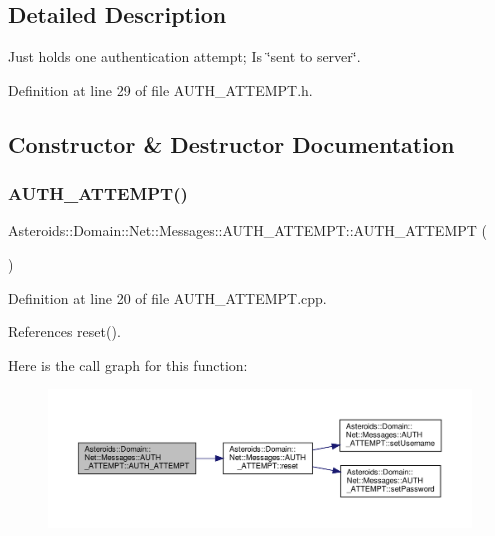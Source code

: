 \subsection{Detailed Description}
Just holds one authentication attempt; Is \char`\"{}sent to server\char`\"{}. 

Definition at line 29 of file A\+U\+T\+H\+\_\+\+A\+T\+T\+E\+M\+P\+T.\+h.



\subsection{Constructor \& Destructor Documentation}
\mbox{\label{classAsteroids_1_1Domain_1_1Net_1_1Messages_1_1AUTH__ATTEMPT_a4c6197274eb2e952137315f9d150f30e}} 
\subsubsection{\texorpdfstring{A\+U\+T\+H\+\_\+\+A\+T\+T\+E\+M\+P\+T()}{AUTH\_ATTEMPT()}}
{\footnotesize\ttfamily Asteroids\+::\+Domain\+::\+Net\+::\+Messages\+::\+A\+U\+T\+H\+\_\+\+A\+T\+T\+E\+M\+P\+T\+::\+A\+U\+T\+H\+\_\+\+A\+T\+T\+E\+M\+PT (\begin{DoxyParamCaption}{ }\end{DoxyParamCaption})}



Definition at line 20 of file A\+U\+T\+H\+\_\+\+A\+T\+T\+E\+M\+P\+T.\+cpp.



References reset().

Here is the call graph for this function\+:\nopagebreak
\begin{figure}[H]
\begin{center}
\leavevmode
\includegraphics[width=350pt]{classAsteroids_1_1Domain_1_1Net_1_1Messages_1_1AUTH__ATTEMPT_a4c6197274eb2e952137315f9d150f30e_cgraph}
\end{center}
\end{figure}


